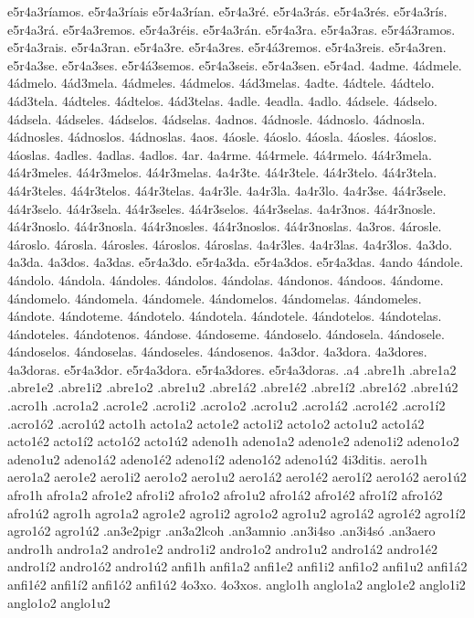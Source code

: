 {e5r4a3ríamos.
e5r4a3ríais
e5r4a3rían.
e5r4a3ré.
e5r4a3rás.
e5r4a3rés.
e5r4a3rís.
e5r4a3rá.
e5r4a3remos.
e5r4a3réis.
e5r4a3rán.
e5r4a3ra.
e5r4a3ras.
e5r4á3ramos.
e5r4a3rais.
e5r4a3ran.
e5r4a3re.
e5r4a3res.
e5r4á3remos.
e5r4a3reis.
e5r4a3ren.
e5r4a3se.
e5r4a3ses.
e5r4á3semos.
e5r4a3seis.
e5r4a3sen.
e5r4ad.
4adme.
4ádmele.
4ádmelo.
4ád3mela.
4ádmeles.
4ádmelos.
4ád3melas.
4adte.
4ádtele.
4ádtelo.
4ád3tela.
4ádteles.
4ádtelos.
4ád3telas.
4adle.
4eadla.
4adlo.
4ádsele.
4ádselo.
4ádsela.
4ádseles.
4ádselos.
4ádselas.
4adnos.
4ádnosle.
4ádnoslo.
4ádnosla.
4ádnosles.
4ádnoslos.
4ádnoslas.
4aos.
4áosle.
4áoslo.
4áosla.
4áosles.
4áoslos.
4áoslas.
4adles.
4adlas.
4adlos.
4ar.
4a4rme.
4á4rmele.
4á4rmelo.
4á4r3mela.
4á4r3meles.
4á4r3melos.
4á4r3melas.
4a4r3te.
4á4r3tele.
4á4r3telo.
4á4r3tela.
4á4r3teles.
4á4r3telos.
4á4r3telas.
4a4r3le.
4a4r3la.
4a4r3lo.
4a4r3se.
4á4r3sele.
4á4r3selo.
4á4r3sela.
4á4r3seles.
4á4r3selos.
4á4r3selas.
4a4r3nos.
4á4r3nosle.
4á4r3noslo.
4á4r3nosla.
4á4r3nosles.
4á4r3noslos.
4á4r3noslas.
4a3ros.
4árosle.
4ároslo.
4árosla.
4árosles.
4ároslos.
4ároslas.
4a4r3les.
4a4r3las.
4a4r3los.
4a3do.
4a3da.
4a3dos.
4a3das.
e5r4a3do.
e5r4a3da.
e5r4a3dos.
e5r4a3das.
4ando
4ándole.
4ándolo.
4ándola.
4ándoles.
4ándolos.
4ándolas.
4ándonos.
4ándoos.
4ándome.
4ándomelo.
4ándomela.
4ándomele.
4ándomelos.
4ándomelas.
4ándomeles.
4ándote.
4ándoteme.
4ándotelo.
4ándotela.
4ándotele.
4ándotelos.
4ándotelas.
4ándoteles.
4ándotenos.
4ándose.
4ándoseme.
4ándoselo.
4ándosela.
4ándosele.
4ándoselos.
4ándoselas.
4ándoseles.
4ándosenos.
4a3dor.
4a3dora.
4a3dores.
4a3doras.
e5r4a3dor.
e5r4a3dora.
e5r4a3dores.
e5r4a3doras.
.a4
.abre1h
.abre1a2 .abre1e2 .abre1i2 .abre1o2 .abre1u2
.abre1á2 .abre1é2 .abre1í2 .abre1ó2 .abre1ú2
.acro1h
.acro1a2 .acro1e2 .acro1i2 .acro1o2 .acro1u2
.acro1á2 .acro1é2 .acro1í2 .acro1ó2 .acro1ú2
acto1h
acto1a2 acto1e2 acto1i2 acto1o2 acto1u2
acto1á2 acto1é2 acto1í2 acto1ó2 acto1ú2
adeno1h
adeno1a2 adeno1e2 adeno1i2 adeno1o2 adeno1u2
adeno1á2 adeno1é2 adeno1í2 adeno1ó2 adeno1ú2
4i3ditis.
aero1h
aero1a2 aero1e2 aero1i2 aero1o2 aero1u2
aero1á2 aero1é2 aero1í2 aero1ó2 aero1ú2
afro1h
afro1a2 afro1e2 afro1i2 afro1o2 afro1u2
afro1á2 afro1é2 afro1í2 afro1ó2 afro1ú2
agro1h
agro1a2 agro1e2 agro1i2 agro1o2 agro1u2
agro1á2 agro1é2 agro1í2 agro1ó2 agro1ú2
.an3e2pigr
.an3a2lcoh
.an3amnio
.an3i4so
.an3i4só
.an3aero
andro1h
andro1a2 andro1e2 andro1i2 andro1o2 andro1u2
andro1á2 andro1é2 andro1í2 andro1ó2 andro1ú2
anfi1h
anfi1a2 anfi1e2 anfi1i2 anfi1o2 anfi1u2
anfi1á2 anfi1é2 anfi1í2 anfi1ó2 anfi1ú2
4o3xo.
4o3xos.
anglo1h
anglo1a2 anglo1e2 anglo1i2 anglo1o2 anglo1u2
}
